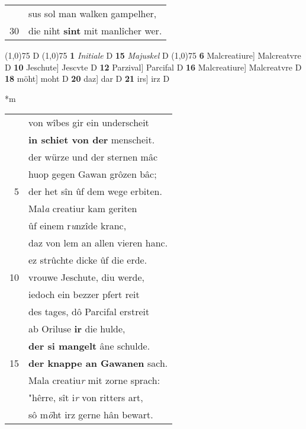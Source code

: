\documentclass[8pt,a4paper,notitlepage]{article}
\begin{document}
\begin{table}[ht]
\begin{minipage}[t]{0.5\linewidth}
\begin{tabular}{rl}
 & sus sol man walken gampelher,\\ 
30 & die niht \textbf{sint} mit manlîcher wer.\\ 
\end{tabular}
\scriptsize
\line(1,0){75} \newline
D \newline
\line(1,0){75} \newline
\textbf{1} \textit{Initiale} D  \textbf{15} \textit{Majuskel} D  \newline
\line(1,0){75} \newline
\textbf{6} Malcreatiure] Malcreatvre D \textbf{10} Jeschute] Jescvte D \textbf{12} Parzival] Parcifal D \textbf{16} Malcreatiure] Malcreatvre D \textbf{18} möht] moht D \textbf{20} daz] dar D \textbf{21} irs] irz D \newline
\end{minipage}
\hspace{0.5cm}
\begin{minipage}[t]{0.5\linewidth}
\small
\begin{center}*m
\end{center}
\begin{tabular}{rl}
 & von wîbes gir ein underscheit\\ 
 & \textbf{in schiet von der} menscheit.\\ 
 & der würze und der sternen mâc\\ 
 & huop gegen Gawan grôzen bâc;\\ 
5 & der het sîn ûf dem wege erbiten.\\ 
 & Mal\textit{a} creatiur kam geriten\\ 
 & ûf einem r\textit{u}nzîde kranc,\\ 
 & daz von lem an allen vieren hanc.\\ 
 & ez strûchte dicke ûf die erde.\\ 
10 & vrouwe Jeschute, diu werde,\\ 
 & iedoch ein bezzer pfert reit\\ 
 & des tages, dô Parcifal erstreit\\ 
 & ab Oriluse \textbf{ir} die hulde,\\ 
 & \textbf{der si mangelt} âne schulde.\\ 
15 & \textbf{der knappe an Gawanen} sach.\\ 
 & Mala creatiu\textit{r} mit zorne sprach:\\ 
 & "hêrre, sît i\textit{r} von ritters art,\\ 
 & sô m\textit{ö}ht irz gerne hân bewart.\\ 

\end{tabular}
\end{minipage}
\end{table}
\end{document}

